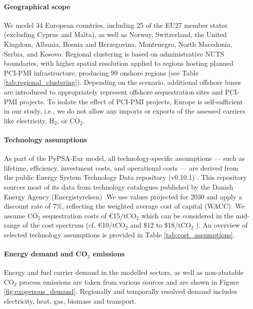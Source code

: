 \documentclass[pdflatex,sn-nature]{sn-jnl}%
\theoremstyle{thmstyleone}%
\theoremstyle{thmstyletwo}%
\theoremstyle{thmstylethree}%
\begin{document}
\paragraph{Geographical scope}\label{sec:geographical_scope}
We model 34 European countries, including 25 of the EU27 member states (excluding Cyprus and Malta), as well as Norway, Switzerland, the United Kingdom, Albania, Bosnia and Herzegovina, Montenegro, North Macedonia, Serbia, and Kosovo. Regional clustering is based on administrative NUTS boundaries, with higher spatial resolution applied to regions hosting planned PCI-PMI infrastructure, producing 99 onshore regions (see Table \ref{tab:regional_clustering}). Depending on the scenario, additional offshore buses are introduced to appropriately represent offshore sequestration sites and PCI-PMI projects. To isolate the effect of PCI-PMI projects, Europe is self-sufficient in our study, i.e., we do not allow any imports or exports of the assessed carriers like electricity, H$_2$, or CO$_2$. 

\paragraph{Technology assumptions} 
\label{sec:technology_assumptions}
As part of the PyPSA-Eur model, all technology-specific assumptions --- such as lifetime, efficiency, investment costs, and operational costs --- are derived from the public Energy System Technology Data repository (v0.10.1) \cite{zeyenPyPSATechnologydataV01012025}. This repository sources most of its data from technology catalogues published by the Danish Energy Agency (Energistyrelsen) \cite{energistyrelsendanishenergyagencyTechnologyCatalogues2024}.We use values projected for 2030 and apply a discount rate of 7\%, reflecting the weighted average cost of capital (WACC). We assume CO$_2$ sequestration costs of €15/tCO$_2$ which can be considered in the mid-range of the cost spectrum (cf. €10/tCO$_2$ \cite{hofmannH2CO2Network2025} and \$12 to \$18/tCO$_2$ \cite{rubinCostCO2Capture2015}). An overview of selected technology assumptions is provided in Table \ref{tab:cost_assumptions}.

\paragraph{Energy demand and CO$_2$ emissions}\label{sec:energy_demand_and_co2_emissions}
Energy and fuel carrier demand in the modelled sectors, as well as non-abatable CO$_2$ process emissions are taken from various sources \cite{mantzosJRCIDEES20152018,eurostatCompleteEnergyBalances2022,manzGeoreferencedIndustrialSites2018,muehlenpfordtTimeSeries2019,krienOemofDemandlibV0222025} and are shown in Figure \ref{fig:exogenous_demand}. Regionally and temporally resolved demand includes electricity, heat, gas, biomass and transport. 
\end{document}
